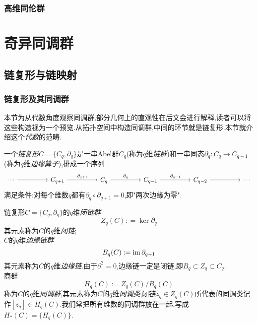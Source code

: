 \documentclass{article}
\begin{document}
\subsubsection{高维同伦群}

\newpage
\section{奇异同调群}
\subsection{链复形与链映射\cite{姜伯驹2006同调论}}
\subsubsection{链复形及其同调群}
本节为从代数角度观察同调群,部分几何上的直观性在后文会进行解释,读者可以将这些构造视为一个预览.从拓扑空间中构造同调群,中间的环节就是链复形.本节就介绍这个\emph{代数}的范畴.
\begin{definition}
    一个\emph{链复形}$C = \{C_q,\partial_q\}$是一串Abel群$C_q$(称为$q$维\emph{链群})和一串同态$\partial_q : C_q \to C_{q-1}$(称为$q$维\emph{边缘算子}),排成一个序列
    \[\begin{tikzcd}
        \cdots && {C_{q+1}} && {C_q} && {C_{q-1}} && {C_{q-2}} && \cdots
        \arrow[from=1-1, to=1-3]
        \arrow["{\partial_{q+1}}", from=1-3, to=1-5]
        \arrow["{\partial_q}", from=1-5, to=1-7]
        \arrow["{\partial_{q-1}}", from=1-7, to=1-9]
        \arrow[from=1-9, to=1-11]
    \end{tikzcd}\]
    满足条件:对每个维数$q$都有$\partial_q \circ \partial_{q+1} = 0$,即"两次边缘为零".
\end{definition}
\begin{definition}
    链复形$C = \{C_q,\partial_q\}$的$q$维\emph{闭链群}
    $$
    Z_q(C) : = \ker \partial_q
    $$
    其元素称为$C$的$q$维\emph{闭链};\\
    $C$的$q$维\emph{边缘链群}
    $$
    B_q(C) := \operatorname{im} \partial_{q+1}
    $$
    其元素称为$C$的$q$维\emph{边缘链}.由于$\partial^2 = 0$,边缘链一定是闭链,即$B_q \subset Z_q \subset C_q$.\\
    商群
    $$
    H_q(C) := Z_q(C)/B_q(C)
    $$
    称为$C$的$q$维\emph{同调群},其元素称为$C$的$q$维\emph{同调类},闭链$z_q \in Z_q(C)$所代表的同调类记作$[z_q]\in H_q(C)$.我们常把所有维数的同调群放在一起,写成$H_*(C) = \{H_q(C)\}$.
\end{definition}
\end{document}
